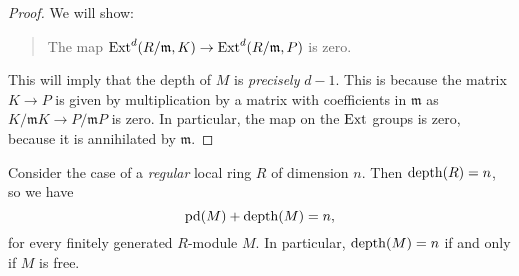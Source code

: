 \begin{proof}
We will show:
\begin{quote}
The map $\operatorname{Ext}^d(R/\mathfrak{m}, K) \to \operatorname{Ext}^{d}(R/\mathfrak{m},
P)$ is zero.
\end{quote}
This will imply that the depth of $M$ is \emph{precisely} $d-1$.
This is because the matrix $K \to P$ is given by multiplication
by a matrix
with coefficients in $\mathfrak{m}$ as $K/\mathfrak{m}K \to
P/\mathfrak{m}P$
is zero. In particular, the map on the $\operatorname{Ext}$ groups is zero,
because it is
annihilated by $\mathfrak{m}$.
\end{proof}

\begin{example} \label{abregularloc}
Consider the case of a \emph{regular} local ring $R$ of dimension $n$. Then
$\operatorname{depth}(R) = n$, so we have
\[ \mathrm{pd}(M) + \operatorname{depth}(M) = n,  \]
for every finitely generated $R$-module $M$.
In particular, $\operatorname{depth}(M) = n$ if and only if $M$ is free.
\end{example} 

